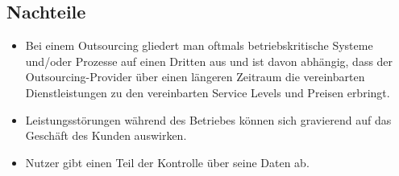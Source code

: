 \subsection{Nachteile}

\begin{itemize}
  \item Bei einem Outsourcing gliedert man oftmals betriebskritische Systeme und/oder Prozesse auf einen Dritten aus und ist davon abhängig, dass der Outsourcing-Provider über einen längeren Zeitraum die vereinbarten Dienstleistungen zu den vereinbarten Service Levels und Preisen erbringt.
  \item Leistungsstörungen während des Betriebes können sich gravierend auf das Geschäft des Kunden auswirken.
  \item Nutzer gibt einen Teil der Kontrolle über seine Daten ab.
\end{itemize}